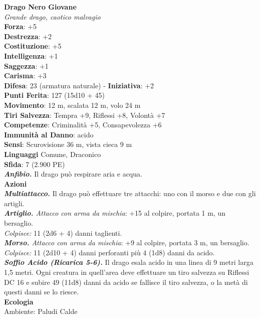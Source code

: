 \begin{multicols}{2}
\medskip\textbf{Drago Nero Giovane}\\
\emph{Grande drago, caotico malvagio}\\
\textbf{Forza}: +5\\
\textbf{Destrezza}: +2\\
\textbf{Costituzione}: +5\\
\textbf{Intelligenza}: +1\\
\textbf{Saggezza}: +1\\
\textbf{Carisma}: +3\\
\textbf{Difesa}: 23 (armatura naturale) - \textbf{Iniziativa}: +2\\
\textbf{Punti Ferita}: 127 (15d10 + 45)\\
\textbf{Movimento}: 12 m, scalata 12 m, volo 24 m\\
\textbf{Tiri Salvezza}: Tempra +9, Riflessi +8, Volontà +7\\
\textbf{Competenze}: Criminalità +5, Consapevolezza +6\\
\textbf{Immunità al Danno}: acido\\
\textbf{Sensi}: Scurovisione 36 m, vista cieca 9 m\\
\textbf{Linguaggi} Comune, Draconico\\
\textbf{Sfida}: 7 (2.900 PE)\smallskip\\
\emph{\textbf{Anfibio.}} Il drago può respirare aria e acqua.\\
\smallskip\textbf{Azioni}\\
\emph{\textbf{Multiattacco.}} Il drago può effettuare tre attacchi: uno con il morso e due con gli artigli.\\
\emph{\textbf{Artiglio.} Attacco con arma da mischia}: +15 al colpire, portata 1 m, un bersaglio.\\
\emph{Colpisce:} 11 (2d6 + 4) danni taglienti.\\
\emph{\textbf{Morso.} Attacco con arma da mischia}: +9 al colpire, portata 3 m, un bersaglio.\\
\emph{Colpisce:} 11 (2d10 + 4) danni perforanti più 4 (1d8) danni da acido.\\
\emph{\textbf{Soffio Acido (Ricarica 5-6).}} Il drago esala acido in una linea di 9 metri larga 1,5 metri. Ogni creatura in quell'area deve effettuare un tiro salvezza su Riflessi DC  16 e subire 49 (11d8) danni da acido se fallisce il tiro salvezza, o la metà di questi danni se lo riesce.\\
\textbf{Ecologia}\\
Ambiente: Paludi Calde\\

\end{multicols}
